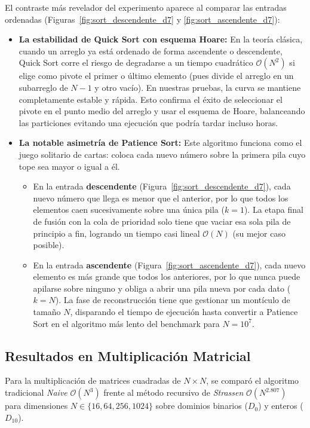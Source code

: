 El contraste más revelador del experimento aparece al comparar las entradas ordenadas (Figuras~\ref{fig:sort_descendente_d7} y \ref{fig:sort_ascendente_d7}):
\begin{itemize}
    \item \textbf{La estabilidad de Quick Sort con esquema Hoare:} En la teoría clásica, cuando un arreglo ya está ordenado de forma ascendente o descendente, Quick Sort corre el riesgo de degradarse a un tiempo cuadrático $\mathcal{O}(N^2)$ si elige como pivote el primer o último elemento (pues divide el arreglo en un subarreglo de $N-1$ y otro vacío). En nuestras pruebas, la curva se mantiene completamente estable y rápida. Esto confirma el éxito de seleccionar el pivote en el punto medio del arreglo y usar el esquema de Hoare, balanceando las particiones evitando una ejecución que podría tardar incluso horas.
    \item \textbf{La notable asimetría de Patience Sort:} Este algoritmo funciona como el juego solitario de cartas: coloca cada nuevo número sobre la primera pila cuyo tope sea mayor o igual a él. 
    \begin{itemize}
        \item En la entrada \textbf{descendente} (Figura~\ref{fig:sort_descendente_d7}), cada nuevo número que llega es menor que el anterior, por lo que todos los elementos caen sucesivamente sobre una única pila ($k=1$). La etapa final de fusión con la cola de prioridad solo tiene que vaciar esa sola pila de principio a fin, logrando un tiempo casi lineal $\mathcal{O}(N)$ (su mejor caso posible).
        \item En la entrada \textbf{ascendente} (Figura~\ref{fig:sort_ascendente_d7}), cada nuevo elemento es más grande que todos los anteriores, por lo que nunca puede apilarse sobre ninguno y obliga a abrir una pila nueva por cada dato ($k=N$). La fase de reconstrucción tiene que gestionar un montículo de tamaño $N$, disparando el tiempo de ejecución hasta convertir a Patience Sort en el algoritmo más lento del benchmark para $N = 10^7$.
    \end{itemize}
\end{itemize}

\subsection{Resultados en Multiplicación Matricial}

Para la multiplicación de matrices cuadradas de $N \times N$, se comparó el algoritmo tradicional \textit{Naive} $\mathcal{O}(N^3)$ frente al método recursivo de \textit{Strassen} $\mathcal{O}(N^{2.807})$~\cite{bytequest2023strassen} para dimensiones $N \in \{16, 64, 256, 1024\}$ sobre dominios binarios ($D_0$) y enteros ($D_{10}$).

